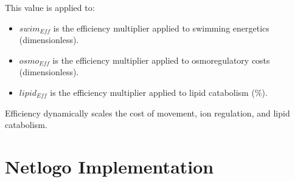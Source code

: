 \documentclass[
]{book}
\begin{document}
This value is applied to:

\begin{itemize}
\item
  \(swim_{Eff}\) is the efficiency multiplier applied to swimming
  energetics (dimensionless).
\item
  \(osmo_{Eff}\) is the efficiency multiplier applied to osmoregulatory
  costs (dimensionless).
\item
  \(lipid_{Eff}\) is the efficiency multiplier applied to lipid
  catabolism (\%).
\end{itemize}

Efficiency dynamically scales the cost of movement, ion regulation, and
lipid catabolism.

\section{Netlogo Implementation}\label{netlogo-implementation}
\end{document}
